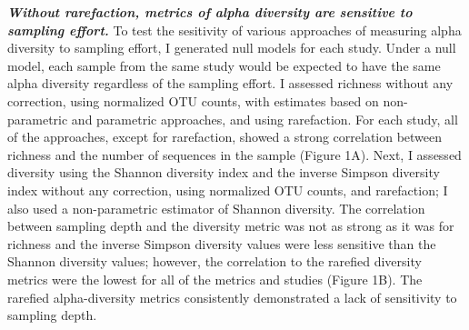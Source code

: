 \documentclass[
]{article}
\begin{document}
\textbf{\emph{Without rarefaction, metrics of alpha diversity are
sensitive to sampling effort.}} To test the sesitivity of various
approaches of measuring alpha diversity to sampling effort, I generated
null models for each study. Under a null model, each sample from the
same study would be expected to have the same alpha diversity regardless
of the sampling effort. I assessed richness without any correction,
using normalized OTU counts, with estimates based on non-parametric and
parametric approaches, and using rarefaction. For each study, all of the
approaches, except for rarefaction, showed a strong correlation between
richness and the number of sequences in the sample (Figure 1A). Next, I
assessed diversity using the Shannon diversity index and the inverse
Simpson diversity index without any correction, using normalized OTU
counts, and rarefaction; I also used a non-parametric estimator of
Shannon diversity. The correlation between sampling depth and the
diversity metric was not as strong as it was for richness and the
inverse Simpson diversity values were less sensitive than the Shannon
diversity values; however, the correlation to the rarefied diversity
metrics were the lowest for all of the metrics and studies (Figure 1B).
The rarefied alpha-diversity metrics consistently demonstrated a lack of
sensitivity to sampling depth.
\end{document}

